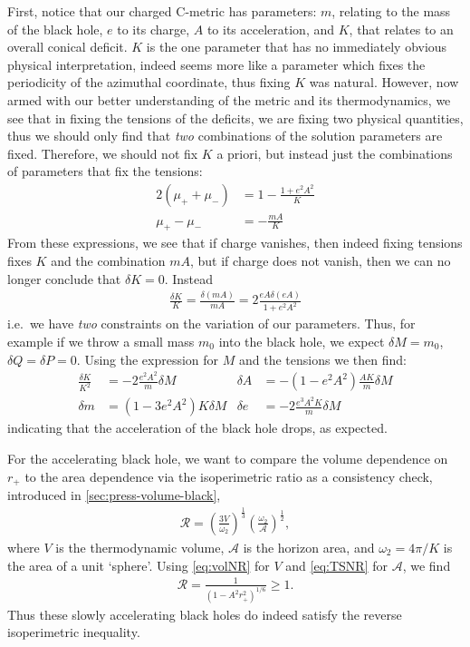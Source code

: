 \documentclass[
twoside,
openright,
frontopenright,
]{dmathesis}
\newcommand{\nn}{\nonumber}
\begin{document}
First, notice that our charged C-metric has parameters: $m$, relating to the
mass of the black hole, $e$ to its charge, $A$ to its acceleration, and $K$,
that relates to an overall conical deficit. $K$ is the one parameter that has no
immediately obvious physical interpretation, indeed seems more like a parameter
which fixes the periodicity of the azimuthal coordinate, thus fixing $K$ was
natural. However, now armed with our better understanding of the metric and its
thermodynamics, we see that in fixing the tensions of the deficits, we are
fixing two physical quantities, thus we should only find that {\it two}
combinations of the solution parameters are fixed. Therefore, we should not fix
$K$ a priori, but instead just the combinations of parameters that fix the
tensions:
\begin{align}
2(\mu_++\mu_-) &= 1 - \frac{1+e^2A^2}{K} \nn\\
\mu_+ - \mu_- &= - \frac{mA}{K}
\end{align}
From these expressions, we see that if charge vanishes, then indeed fixing
tensions fixes $K$ and the combination $mA$, but if charge does not vanish, then
we can no longer conclude that $\delta K=0$. Instead
\begin{align}
  \frac{\delta K}{K} = \frac{\delta (mA)}{mA} = 2\frac{eA\delta (eA)}{1+e^2A^2}
\end{align}
i.e.\ we have {\it two} constraints on the variation of our parameters.  Thus,
for example if we throw a small mass $m_0$ into the black hole, we expect
$\delta M = m_0$, $\delta Q=\delta P = 0$. Using the expression for $M$ and the
tensions we then find:
\begin{align}
\frac{\delta K}{K^2} &= - 2 \frac{e^2 A^2}{m}\delta M &
\delta A &= - (1-e^2 A^2) \frac{AK}{m} \delta M\nn\\
\delta m &= (1- 3 e^2 A^2) K \delta M&
\delta e &= -2\frac{e^3A^2K}{m} \delta M
\end{align}
indicating that the acceleration of the black hole drops, as expected.

For the accelerating black hole, we want to compare the volume dependence on
$r_+$ to the area dependence via the isoperimetric ratio as a consistency check,
introduced in \cref{sec:press-volume-black},
\begin{align}
\mathcal{R}=\left(\frac{3V}{\omega_{2}}\right)^\frac13
  \left(\frac{\omega_{2}}{\mathcal{A}}\right)^\frac12, 
\end{align}
where $V$ is the thermodynamic volume, $\mathcal{A}$ is the horizon area, and
$\omega_2=4\pi/K$ is the area of a unit `sphere'.  Using \cref{eq:volNR} for
$V$ and \cref{eq:TSNR} for $\mathcal{A}$, we find
\begin{align}
\mathcal{R}=\frac{1}{(1-A^2r_+^2)^{1/6}}\geqslant 1.
\end{align}
Thus these slowly accelerating black holes do indeed satisfy the
reverse isoperimetric inequality.
\end{document}
